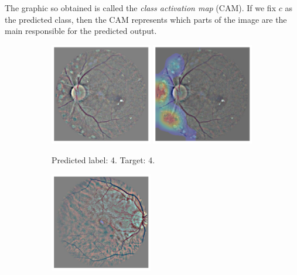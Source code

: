 The graphic so obtained is called the \textit{class activation map} (CAM). If we fix \( c \) as the predicted class, then the CAM represents which parts of the image are the main responsible for the predicted output.

\begin{figure}[tb]
     \begin{subfigure}[b]{0.49\textwidth}
         \centering
         \includegraphics[width=0.49\textwidth,height=0.49\textwidth]{figures/chapter6/heatmaps/28699_left.png}
         \includegraphics[width=0.49\textwidth,height=0.49\textwidth]{figures/chapter6/heatmaps/28699_left_heatmap.png}
         \caption{Predicted label: 4. Target: 4.}
    \end{subfigure}
    \hfill
    \begin{subfigure}[b]{0.49\textwidth}
         \centering
         \includegraphics[width=0.49\textwidth,height=0.49\textwidth]{figures/chapter6/heatmaps/5_right.png}

\end{subfigure}
\end{figure}
